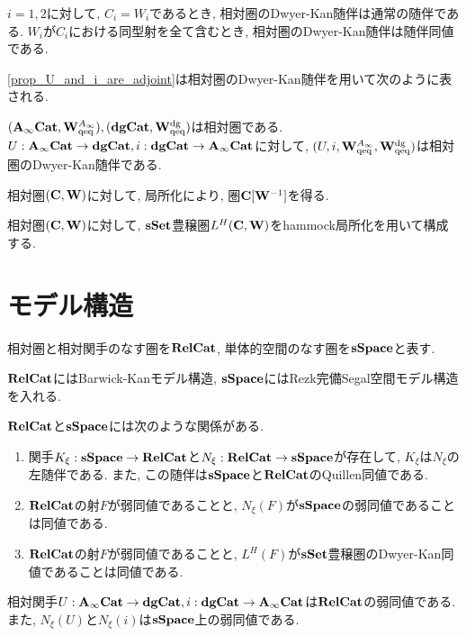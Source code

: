 \documentclass[uplatex, a4paper, 14Q, dvipdfmx]{jsarticle}
\begin{document}
\begin{remark}
  $i=1,2$に対して, $C_i=W_i$であるとき, 相対圏のDwyer-Kan随伴は通常の随伴である.
  $W_i$が$C_i$における同型射を全て含むとき, 相対圏のDwyer-Kan随伴は随伴同値である. 
\end{remark}

\cref{prop_U_and_i_are_adjoint}は相対圏のDwyer-Kan随伴を用いて次のように表される. 

\begin{theorem}
  $(\mathbf{A}_\infty\mathbf{Cat}, \mathbf{W}^{A_{\infty}}_\mathrm{qeq}), (\mathbf{dgCat}, \mathbf{W}^{\mathrm{dg}}_\mathrm{qeq})$は相対圏である. 
  $U : \mathbf{A}_\infty\mathbf{Cat} \to \mathbf{dgCat}, i : \mathbf{dgCat} \to \mathbf{A}_\infty\mathbf{Cat}$に対して, $(U,i,\mathbf{W}^{A_{\infty}}_\mathrm{qeq}, \mathbf{W}^{\mathrm{dg}}_\mathrm{qeq})$は相対圏のDwyer-Kan随伴である. 
\end{theorem}

相対圏$(\mathbf{C},\mathbf{W})$に対して, 局所化により, 圏$\mathbf{C}[\mathbf{W}^{-1}]$を得る. 

\begin{definition}[hammock局所化]
  相対圏$(\mathbf{C},\mathbf{W})$に対して, $\mathbf{sSet}$豊穣圏$L^H(\mathbf{C},\mathbf{W})$をhammock局所化を用いて構成する.
\end{definition}


\section{モデル構造}

\begin{notation}
  相対圏と相対関手のなす圏を$\mathbf{RelCat}$, 単体的空間のなす圏を$\mathbf{sSpace}$と表す. 
\end{notation}

$\mathbf{RelCat}$にはBarwick-Kanモデル構造, $\mathbf{sSpace}$にはRezk完備Segal空間モデル構造を入れる. 

\begin{theorem}
  $\mathbf{RelCat}$と$\mathbf{sSpace}$には次のような関係がある.
  \begin{enumerate}
    \item 関手$K_\xi : \mathbf{sSpace} \to \mathbf{RelCat}$と$N_\xi : \mathbf{RelCat} \to \mathbf{sSpace}$が存在して, $K_\xi$は$N_\xi$の左随伴である.
    また, この随伴は$\mathbf{sSpace}$と$\mathbf{RelCat}$のQuillen同値である.
    \item $\mathbf{RelCat}$の射$F$が弱同値であることと, $N_\xi(F)$が$\mathbf{sSpace}$の弱同値であることは同値である.
    \item $\mathbf{RelCat}$の射$F$が弱同値であることと, $L^H(F)$が$\mathbf{sSet}$豊穣圏のDwyer-Kan同値であることは同値である. 
  \end{enumerate}
\end{theorem}

\begin{corollary}
  相対関手$U : \mathbf{A}_\infty\mathbf{Cat} \to \mathbf{dgCat}, i : \mathbf{dgCat} \to \mathbf{A}_\infty\mathbf{Cat}$は$\mathbf{RelCat}$の弱同値である. 
  また, $N_\xi(U)$と$N_\xi(i)$は$\mathbf{sSpace}$上の弱同値である. 
\end{corollary}
\end{document}
